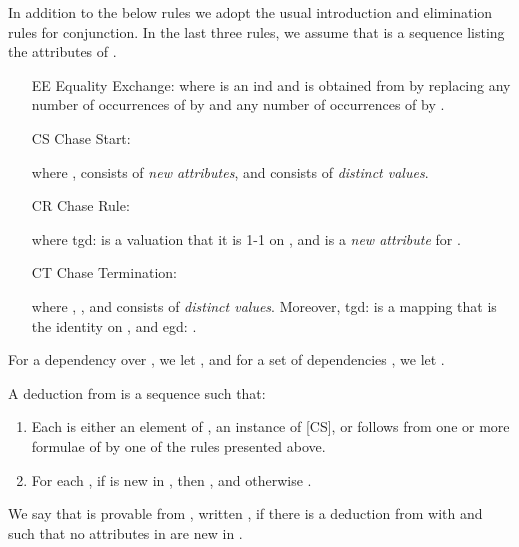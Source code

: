 \documentclass[envcountset]{llncs}
\begin{document}
\begin{definition}\label{axioms}
In addition to the below rules we adopt the usual introduction and elimination rules for conjunction. In the last three rules, we assume that  is a sequence listing the attributes of .
\\
\begin{itemize}







\item[EE] Equality Exchange: 
where  is an ind and  is obtained from  by replacing any number of occurrences of  by  and any number of occurrences of  by .








\item[CS] Chase Start: 

where ,   consists of \emph{new attributes}, and  consists of \emph{distinct values}. 

\item[CR] Chase Rule: 



where tgd:  is a valuation that it is 1-1 on , and  is a \emph{new attribute} for .

\item[CT] Chase Termination: 





where  , , and  consists of \emph{distinct values}. Moreover, tgd:  is a mapping   that is the identity on , and egd: .
\end{itemize}
\end{definition}


For a dependency  over , we let , and for a set of dependencies , we let  .

\begin{definition}\label{dedu}
A deduction from  is a sequence  such that:
\begin{enumerate}
\item Each  is either an element of , an instance of [CS], or follows from one or more formulae of  by one of the rules presented above.
\item For each , if  is new in , then , and otherwise .
\end{enumerate}
We say that  is provable from , written , if there is a deduction  from  with  and such that no attributes in  are new in . \end{definition}
\end{document}
